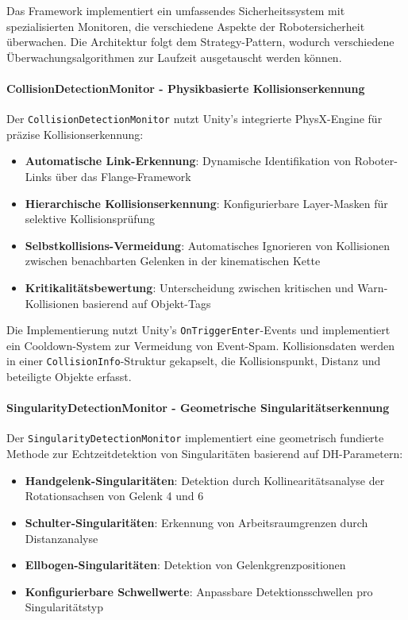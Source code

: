 Das Framework implementiert ein umfassendes Sicherheitssystem mit
spezialisierten Monitoren, die verschiedene Aspekte der Robotersicherheit
überwachen. Die Architektur folgt dem Strategy-Pattern, wodurch verschiedene
Überwachungsalgorithmen zur Laufzeit ausgetauscht werden können.

\paragraph{CollisionDetectionMonitor - Physikbasierte Kollisionserkennung}
Der \texttt{CollisionDetectionMonitor} nutzt Unity's integrierte PhysX-Engine
für präzise Kollisionserkennung:

\begin{itemize}
    \item \textbf{Automatische Link-Erkennung}: Dynamische Identifikation von Roboter-Links über das Flange-Framework
    \item \textbf{Hierarchische Kollisionserkennung}: Konfigurierbare Layer-Masken für selektive Kollisionsprüfung
    \item \textbf{Selbstkollisions-Vermeidung}: Automatisches Ignorieren von Kollisionen zwischen benachbarten Gelenken in der kinematischen Kette
    \item \textbf{Kritikalitätsbewertung}: Unterscheidung zwischen kritischen und Warn-Kollisionen basierend auf Objekt-Tags
\end{itemize}

Die Implementierung nutzt Unity's \texttt{OnTriggerEnter}-Events und
implementiert ein Cooldown-System zur Vermeidung von Event-Spam.
Kollisionsdaten werden in einer \texttt{CollisionInfo}-Struktur gekapselt, die
Kollisionspunkt, Distanz und beteiligte Objekte erfasst.

\paragraph{SingularityDetectionMonitor - Geometrische Singularitätserkennung}
Der \texttt{SingularityDetectionMonitor} implementiert eine geometrisch
fundierte Methode zur Echtzeitdetektion von Singularitäten basierend auf
DH-Parametern:

\begin{itemize}
    \item \textbf{Handgelenk-Singularitäten}: Detektion durch Kollinearitätsanalyse der Rotationsachsen von Gelenk 4 und 6
    \item \textbf{Schulter-Singularitäten}: Erkennung von Arbeitsraumgrenzen durch Distanzanalyse
    \item \textbf{Ellbogen-Singularitäten}: Detektion von Gelenkgrenzpositionen
    \item \textbf{Konfigurierbare Schwellwerte}: Anpassbare Detektionsschwellen pro Singularitätstyp
\end{itemize}


